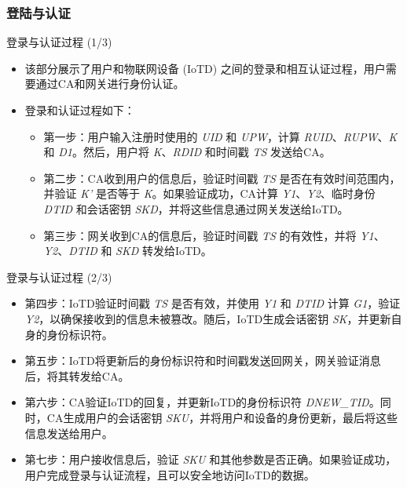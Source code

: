 \documentclass{beamer}
\begin{document}
\subsubsection{登陆与认证}
\begin{frame}{登录与认证过程 (1/3)}
    \begin{itemize}
        \item 该部分展示了用户和物联网设备 (IoTD) 之间的登录和相互认证过程，用户需要通过CA和网关进行身份认证。
        \item 登录和认证过程如下：
        \begin{itemize}
            \item 第一步：用户输入注册时使用的 \textit{UID} 和 \textit{UPW}，计算 \textit{RUID}、\textit{RUPW}、\textit{K} 和 \textit{D1}。然后，用户将 \textit{K}、\textit{RDID} 和时间戳 \textit{TS} 发送给CA。
            \item 第二步：CA收到用户的信息后，验证时间戳 \textit{TS} 是否在有效时间范围内，并验证 \textit{K'} 是否等于 \textit{K}。如果验证成功，CA计算 \textit{Y1}、\textit{Y2}、临时身份 \textit{DTID} 和会话密钥 \textit{SKD}，并将这些信息通过网关发送给IoTD。
            \item 第三步：网关收到CA的信息后，验证时间戳 \textit{TS} 的有效性，并将 \textit{Y1}、\textit{Y2}、\textit{DTID} 和 \textit{SKD} 转发给IoTD。
        \end{itemize}
    \end{itemize}
\end{frame}

\begin{frame}{登录与认证过程 (2/3)}
    \begin{itemize}
        \item 第四步：IoTD验证时间戳 \textit{TS} 是否有效，并使用 \textit{Y1} 和 \textit{DTID} 计算 \textit{G1}，验证 \textit{Y2}，以确保接收到的信息未被篡改。随后，IoTD生成会话密钥 \textit{SK}，并更新自身的身份标识符。
        \item 第五步：IoTD将更新后的身份标识符和时间戳发送回网关，网关验证消息后，将其转发给CA。
        \item 第六步：CA验证IoTD的回复，并更新IoTD的身份标识符 \textit{DNEW\_TID}。同时，CA生成用户的会话密钥 \textit{SKU}，并将用户和设备的身份更新，最后将这些信息发送给用户。
        \item 第七步：用户接收信息后，验证 \textit{SKU} 和其他参数是否正确。如果验证成功，用户完成登录与认证流程，且可以安全地访问IoTD的数据。
    \end{itemize}
\end{frame}
\end{document}
